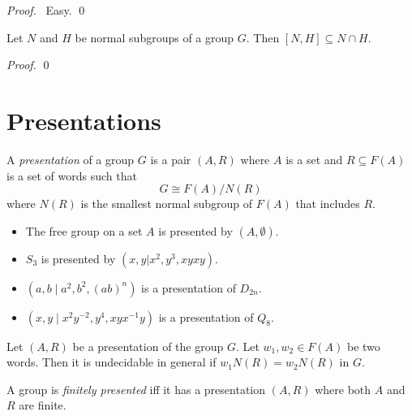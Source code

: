 \begin{proof}
\pf\ Easy. \qed
\end{proof}

\begin{lm}
Let $N$ and $H$ be normal subgroups of a group $G$. Then $[N,H] \subseteq N \cap H$.
\end{lm}

\begin{proof}
\pf
{}
\qed
\end{proof}

\section{Presentations}

\begin{df}[Presentation]
A \emph{presentation} of a group $G$ is a pair $(A,R)$ where $A$ is a set and $R \subseteq F(A)$ is a set of words such that
\[ G \cong F(A) / N(R) \]
where $N(R)$ is the smallest normal subgroup of $F(A)$ that includes $R$.
\end{df}

\begin{ex}
\begin{itemize}
\item The free group on a set $A$ is presented by $(A, \emptyset)$.
\item $S_3$ is presented by $(x,y|x^2,y^3,xyxy)$.
\item 
$(a,b \mid a^2, b^2, (ab)^n)$ is a presentation of $D_{2n}$.
\item $(x,y \mid x^2 y^{-2}, y^4, xyx^{-1}y)$ is a presentation of $Q_8$.
\end{itemize}
\end{ex}

\begin{prop}
Let $(A,R)$ be a presentation of the group $G$. Let $w_1, w_2 \in F(A)$ be two words. Then it is undecidable in general if $w_1N(R) = w_2N(R)$ in $G$.
\end{prop}

\begin{df}
A group is \emph{finitely presented} iff it has a presentation $(A,R)$ where both $A$ and $R$ are finite.
\end{df}

